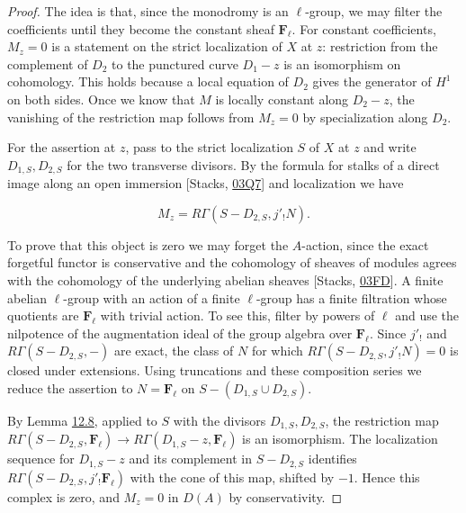 \documentclass[11pt]{article}
\begin{document}
\begin{proof}[{Proof}]\label{bp29}%
The idea is that, since the monodromy is an \(\ell\)-group, we may filter the coefficients until they become the constant sheaf \(\mathbf F_\ell\). For constant coefficients, \(M_z=0\) is a statement on the strict localization of \(X\) at \(z\): restriction from the complement of \(D_2\) to the punctured curve \(D_1-z\) is an isomorphism on cohomology. This holds because a local equation of \(D_2\) gives the generator of \(H^1\) on both sides. Once we know that \(M\) is locally constant along \(D_2-z\), the vanishing of the restriction map follows from \(M_z=0\) by specialization along \(D_2\).

For the assertion at \(z\), pass to the strict localization \(S\) of \(X\) at \(z\) and write \(D_{1,S},D_{2,S}\) for the two transverse divisors. By the formula for stalks of a direct image along an open immersion [Stacks, \href{https://stacks.math.columbia.edu/tag/03Q7}{03Q7}] and localization we have

\[
M_z=R\Gamma(S-D_{2,S},j'_!N).
\]

To prove that this object is zero we may forget the \(A\)-action, since the exact forgetful functor is conservative and the cohomology of sheaves of modules agrees with the cohomology of the underlying abelian sheaves [Stacks, \href{https://stacks.math.columbia.edu/tag/03FD}{03FD}]. A finite abelian \(\ell\)-group with an action of a finite \(\ell\)-group has a finite filtration whose quotients are \(\mathbf F_\ell\) with trivial action. To see this, filter by powers of \(\ell\) and use the nilpotence of the augmentation ideal of the group algebra over \(\mathbf F_\ell\). Since \(j'_!\) and \(R\Gamma(S-D_{2,S},-)\) are exact, the class of \(N\) for which \(R\Gamma(S-D_{2,S},j'_!N)=0\) is closed under extensions. Using truncations and these composition series we reduce the assertion to \(N=\mathbf F_\ell\) on \(S-(D_{1,S}\cup D_{2,S})\).

By Lemma \hyperref[bp26]{12.8}, applied to \(S\) with the divisors \(D_{1,S},D_{2,S}\), the restriction map \(R\Gamma(S-D_{2,S},\mathbf F_\ell)\to R\Gamma(D_{1,S}-z,\mathbf F_\ell)\) is an isomorphism. The localization sequence for \(D_{1,S}-z\) and its complement in \(S-D_{2,S}\) identifies \(R\Gamma(S-D_{2,S},j'_!\mathbf F_\ell)\) with the cone of this map, shifted by \(-1\). Hence this complex is zero, and \(M_z=0\) in \(D(A)\) by conservativity.


\end{proof}
\end{document}

